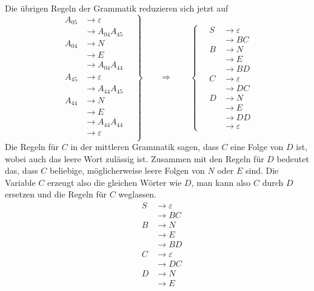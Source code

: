 \begin{loesung}
Die übrigen Regeln der Grammatik reduzieren sich jetzt auf
\[
\left.
\begin{aligned}
A_{05}&\to \varepsilon \\
      &\to A_{04}A_{45} \\
A_{04}&\to N\\
      &\to E\\
      &\to A_{04}A_{44} \\
A_{45}&\to\varepsilon\\
      &\to A_{44}A_{45}\\
A_{44}&\to N\\
      &\to E\\
      &\to A_{44}A_{44} \\
      &\to \varepsilon \\
\end{aligned}
\quad
\right\}
\qquad\Rightarrow\qquad
\left\{
\quad
\begin{aligned}
S      &\to \varepsilon \\
       &\to BC \\
B      &\to N      \\
       &\to E      \\
       &\to BD \\
C      &\to \varepsilon \\
       &\to DC \\
D      &\to N \\
       &\to E \\
       &\to DD \\
       &\to\varepsilon
\end{aligned}
\right.
\]
Die Regeln für $C$ in der mittleren Grammatik sagen, dass $C$ eine Folge
von $D$ ist, wobei auch das leere Wort zulässig ist.
Zusammen mit den Regeln für $D$ bedeutet das, dass $C$ beliebige,
möglicherweise leere Folgen von $N$ oder $E$ sind.
Die Variable $C$ erzeugt also die gleichen Wörter wie $D$, man kann
also $C$ durch $D$ ersetzen und die Regeln für $C$ weglassen.
\[
\left.
\quad
\begin{aligned}
S      &\to \varepsilon \\
       &\to BC \\
B      &\to N      \\
       &\to E      \\
       &\to BD \\
C      &\to \varepsilon \\
       &\to DC \\
D      &\to N \\
       &\to E \\

\end{aligned}\]
\end{loesung}
